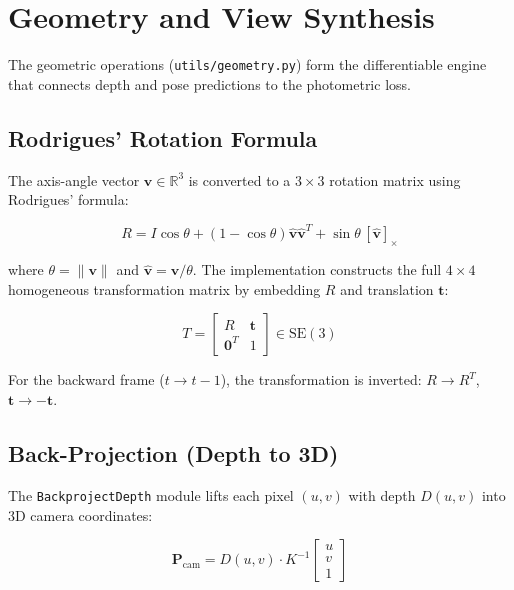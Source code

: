 \documentclass[10pt, a4paper, twocolumn]{article}
\begin{document}
\section{Geometry and View Synthesis}
\label{sec:geometry}

The geometric operations (\texttt{utils/geometry.py}) form the differentiable engine that connects depth and pose predictions to the photometric loss.

\subsection{Rodrigues' Rotation Formula}

The axis-angle vector $\mathbf{v} \in \mathbb{R}^3$ is converted to a $3\times3$ rotation matrix using Rodrigues' formula:

\begin{equation}
R = I \cos\theta + (1-\cos\theta)\hat{\mathbf{v}}\hat{\mathbf{v}}^T + \sin\theta\,[\hat{\mathbf{v}}]_\times
\label{eq:rodrigues}
\end{equation}

where $\theta = \|\mathbf{v}\|$ and $\hat{\mathbf{v}} = \mathbf{v}/\theta$. The implementation constructs the full $4\times4$ homogeneous transformation matrix by embedding $R$ and translation $\mathbf{t}$:

\begin{equation}
T = \begin{bmatrix} R & \mathbf{t} \\ \mathbf{0}^T & 1 \end{bmatrix} \in \text{SE}(3)
\end{equation}

For the backward frame ($t \to t{-}1$), the transformation is inverted: $R \to R^T$, $\mathbf{t} \to -\mathbf{t}$.

\subsection{Back-Projection (Depth to 3D)}

The \texttt{BackprojectDepth} module lifts each pixel $(u, v)$ with depth $D(u,v)$ into 3D camera coordinates:

\begin{equation}
\mathbf{P}_{\text{cam}} = D(u,v) \cdot K^{-1} \begin{bmatrix} u \\ v \\ 1\end{bmatrix}
\end{equation}
\end{document}
